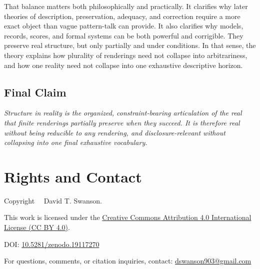 \documentclass[11pt]{article}
\renewenvironment{quote}
  {\list{}{\leftmargin=1.4em \rightmargin=1.0em}%
   \item\relax\color{softink}\itshape}
  {\endlist}
\begin{document}
That balance matters both philosophically and practically. It clarifies why later theories of description, preservation, adequacy, and correction require a more exact object than vague pattern-talk can provide. It also clarifies why models, records, scores, and formal systems can be both powerful and corrigible. They preserve real structure, but only partially and under conditions. In that sense, the theory explains how plurality of renderings need not collapse into arbitrariness, and how one reality need not collapse into one exhaustive descriptive horizon.

\subsection{Final Claim}

\begin{quote}
Structure in reality is the organized, constraint-bearing articulation of the real that finite renderings partially preserve when they succeed. It is therefore real without being reducible to any rendering, and disclosure-relevant without collapsing into one final exhaustive vocabulary.
\end{quote}



\section*{Rights and Contact}

\noindent
Copyright \textcopyright\ \the\year\ David T. Swanson.

\noindent
This work is licensed under the
\href{https://creativecommons.org/licenses/by/4.0/}
{Creative Commons Attribution 4.0 International License (CC BY 4.0)}.

\noindent
DOI:
\href{https://doi.org/10.5281/zenodo.19117270}{10.5281/zenodo.19117270}

\noindent
For questions, comments, or citation inquiries, contact:
\href{mailto:dswanson903@gmail.com}{dswanson903@gmail.com}
\end{document}
